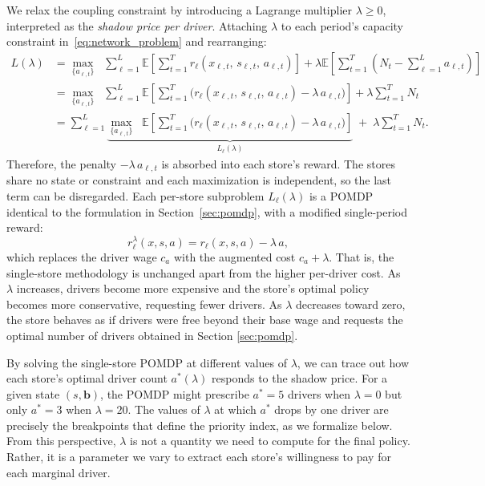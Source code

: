 \documentclass[preprint,11pt,authoryear]{elsarticle}
\newcommand{\bvec}[1]{\mathbf{#1}}
\theoremstyle{remark}
\begin{document}
We relax the coupling constraint by introducing a Lagrange multiplier $\lambda \geq 0$, interpreted as the \emph{shadow price per driver}. Attaching $\lambda$ to each period's capacity constraint in~\eqref{eq:network_problem} and rearranging:
\begin{align}
    L(\lambda) &= \max_{\{a_{\ell,t}\}} \;\; \sum_{\ell=1}^{L} \mathbb{E}\!\left[\sum_{t=1}^{T} r_\ell(x_{\ell,t},\, s_{\ell,t},\, a_{\ell,t})\right] + \lambda \mathbb{E} \left[\sum_{t=1}^{T}\!\left(N_t - \sum_{\ell=1}^{L} a_{\ell,t}\right)\right] \nonumber \\
    &= \max_{\{a_{\ell,t}\}} \;\; \sum_{\ell=1}^{L} \mathbb{E}\!\left[\sum_{t=1}^{T} \bigl(r_\ell(x_{\ell,t},\, s_{\ell,t},\, a_{\ell,t}) - \lambda \, a_{\ell,t}\bigr)\right] + \lambda \sum_{t=1}^{T} N_t \nonumber \\
    &= \sum_{\ell=1}^{L} \underbrace{\max_{\{a_{\ell,t}\}} \;\; \mathbb{E}\!\left[\sum_{t=1}^{T} \bigl(r_\ell(x_{\ell,t},\, s_{\ell,t},\, a_{\ell,t}) - \lambda \, a_{\ell,t}\bigr)\right]}_{L_\ell(\lambda)} \;+\; \lambda \sum_{t=1}^{T} N_t.
    \label{eq:lagrangian}
\end{align}
Therefore, the penalty $-\lambda\,a_{\ell,t}$ is absorbed into each store's reward. The stores share no state or constraint and each maximization is independent, so the last term can be disregarded. Each per-store subproblem $L_\ell(\lambda)$ is a POMDP identical to the formulation in Section~\ref{sec:pomdp}, with a modified single-period reward:
\begin{equation}
    r_\ell^{\lambda}(x, s, a) = r_\ell(x, s, a) - \lambda \, a,
    \label{eq:reward_lambda}
\end{equation}
which replaces the driver wage $c_a$ with the augmented cost $c_a + \lambda$. That is, the single-store methodology is unchanged apart from the higher per-driver cost. As $\lambda$ increases, drivers become more expensive and the store's optimal policy becomes more conservative, requesting fewer drivers. As $\lambda$ decreases toward zero, the store behaves as if drivers were free beyond their base wage and requests the optimal number of drivers obtained in Section \ref{sec:pomdp}.

By solving the single-store POMDP at different values of $\lambda$, we can trace out how each store's optimal driver count $a^*(\lambda)$ responds to the shadow price. For a given state $(s, \bvec{b})$, the POMDP might prescribe $a^* = 5$ drivers when $\lambda = 0$ but only $a^* = 3$ when $\lambda = 20$. The values of $\lambda$ at which $a^*$ drops by one driver are precisely the breakpoints that define the priority index, as we formalize below. From this perspective, $\lambda$ is not a quantity we need to compute for the final policy. Rather, it is a parameter we vary to extract each store's willingness to pay for each marginal driver.
\end{document}

